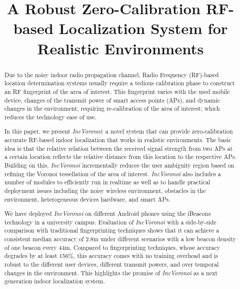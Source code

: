 \documentclass[conference]{IEEEtran}
\def \sys {\textit{IncVoronoi}}
\begin{document}
\title{A Robust Zero-Calibration RF-based Localization System for Realistic Environments}

\author{
\and
{}
}

\maketitle

\begin{abstract}
Due to the noisy indoor radio propagation channel, Radio Frequency (RF)-based location determination systems usually require a tedious calibration phase to construct an RF fingerprint of the area of interest. This fingerprint varies with the used mobile device, changes of the transmit power of smart access points (APs), and dynamic changes in the environment; requiring re-calibration of the area of interest; which reduces the technology ease of use. 

In this paper, we present \sys{}: a novel system that can provide zero-calibration accurate RF-based indoor localization that works in realistic environments. The basic idea is that the relative relation between the received signal strength from two APs at a certain location reflects the relative distance from this location to the respective APs. Building on this, \sys{} incrementally reduces the user ambiguity region based on refining the Voronoi tessellation of the area of interest. 
\sys{} also includes a number of modules to efficiently run in realtime as well as to handle practical deployment issues including the noisy wireless environment, obstacles in the environment, heterogeneous devices hardware, and smart APs.

We have deployed \sys{} on different Android phones using the iBeacons technology in a university campus.
Evaluation of \sys{} with a side-by-side comparison with traditional fingerprinting techniques shows that it can achieve a consistent median accuracy of 2.8m under different scenarios with a low beacon density of one beacon every 44m. Compared to fingerprinting techniques, whose accuracy degrades by at least 156\%, this accuracy comes with no training overhead and is robust to the different user devices, different transmit powers, and over temporal changes in the environment. This highlights the promise of \sys{} as a next generation indoor localization system.
\end{abstract}
\end{document}
